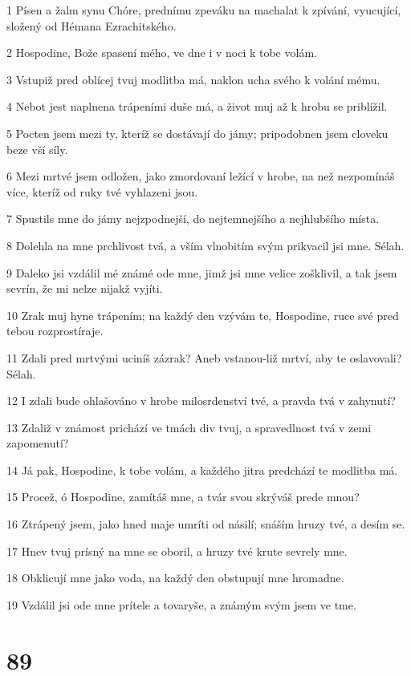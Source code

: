 \par 1 Písen a žalm synu Chóre, prednímu zpeváku na machalat k zpívání, vyucující, složený od Hémana Ezrachitského.
\par 2 Hospodine, Bože spasení mého, ve dne i v noci k tobe volám.
\par 3 Vstupiž pred oblícej tvuj modlitba má, naklon ucha svého k volání mému.
\par 4 Nebot jest naplnena trápeními duše má, a život muj až k hrobu se priblížil.
\par 5 Pocten jsem mezi ty, kteríž se dostávají do jámy; pripodobnen jsem cloveku beze vší síly.
\par 6 Mezi mrtvé jsem odložen, jako zmordovaní ležící v hrobe, na než nezpomínáš více, kteríž od ruky tvé vyhlazeni jsou.
\par 7 Spustils mne do jámy nejzpodnejší, do nejtemnejšího a nejhlubšího místa.
\par 8 Dolehla na mne prchlivost tvá, a vším vlnobitím svým prikvacil jsi mne. Sélah.
\par 9 Daleko jsi vzdálil mé známé ode mne, jimž jsi mne velice zošklivil, a tak jsem sevrín, že mi nelze nijakž vyjíti.
\par 10 Zrak muj hyne trápením; na každý den vzývám te, Hospodine, ruce své pred tebou rozprostíraje.
\par 11 Zdali pred mrtvými uciníš zázrak? Aneb vstanou-liž mrtví, aby te oslavovali?Sélah.
\par 12 I zdali bude ohlašováno v hrobe milosrdenství tvé, a pravda tvá v zahynutí?
\par 13 Zdaliž v známost prichází ve tmách div tvuj, a spravedlnost tvá v zemi zapomenutí?
\par 14 Já pak, Hospodine, k tobe volám, a každého jitra predchází te modlitba má.
\par 15 Procež, ó Hospodine, zamítáš mne, a tvár svou skrýváš prede mnou?
\par 16 Ztrápený jsem, jako hned maje umríti od násilí; snáším hruzy tvé, a desím se.
\par 17 Hnev tvuj prísný na mne se oboril, a hruzy tvé krute sevrely mne.
\par 18 Obklicují mne jako voda, na každý den obstupují mne hromadne.
\par 19 Vzdálil jsi ode mne prítele a tovaryše, a známým svým jsem ve tme.

\chapter{89}

